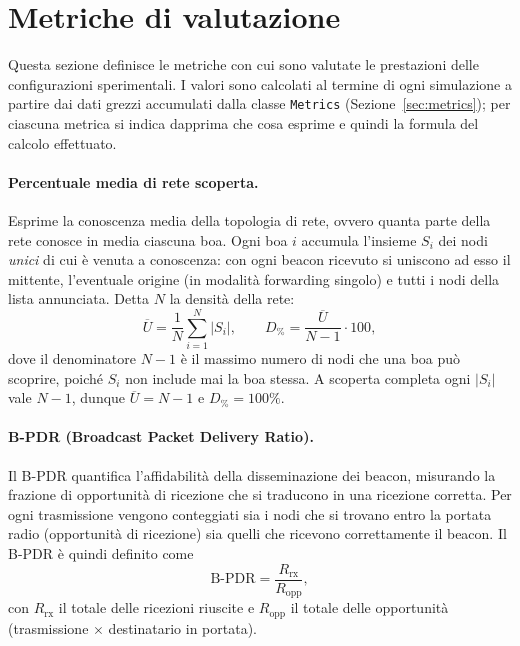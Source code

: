 \section{Metriche di valutazione}
\label{sec:eval-metrics}
Questa sezione definisce le metriche con cui sono valutate le prestazioni
delle configurazioni sperimentali. I valori sono calcolati al termine di ogni
simulazione a partire dai dati grezzi accumulati dalla classe \texttt{Metrics}
(Sezione~\ref{sec:metrics}); per ciascuna metrica si indica dapprima che cosa
esprime e quindi la formula del calcolo effettuato.

\paragraph{Percentuale media di rete scoperta.} Esprime la conoscenza media
della topologia di rete, ovvero quanta parte della rete conosce in media ciascuna boa.
Ogni boa $i$ accumula l'insieme
$S_i$ dei nodi \emph{unici} di cui \`e venuta a conoscenza:  con ogni beacon
ricevuto si uniscono ad esso il mittente, l'eventuale origine (in modalit\`a
forwarding singolo) e tutti i nodi della lista annunciata. Detta $N$ la densit\`a della rete:
\begin{equation}
  \overline{U} = \frac{1}{N} \sum_{i=1}^{N} |S_i|,
  \qquad
  D_{\%} = \frac{\overline{U}}{N-1} \cdot 100,
  \label{eq:netdisc}
\end{equation}
dove il denominatore $N-1$ \`e il massimo numero di nodi che una boa pu\`o
scoprire, poich\'e $S_i$ non include mai la boa stessa. A scoperta completa
ogni $|S_i|$ vale $N-1$, dunque $\overline{U}=N-1$ e $D_{\%}=100\%$.

\paragraph{B-PDR (Broadcast Packet Delivery Ratio).} Il B-PDR quantifica
l'affidabilit\`a della disseminazione dei beacon, misurando la frazione di
opportunit\`a di ricezione che si traducono in una ricezione corretta. Per ogni
trasmissione vengono conteggiati sia i nodi che si trovano entro la portata
radio (opportunit\`a di ricezione) sia quelli che ricevono correttamente il
beacon. Il B-PDR \`e quindi definito come
\begin{equation}
  \text{B-PDR} = \frac{R_{\text{rx}}}{R_{\text{opp}}},
  \label{eq:bpdr}
\end{equation}
con $R_{\text{rx}}$ il totale delle ricezioni riuscite e $R_{\text{opp}}$ il
totale delle opportunit\`a (trasmissione $\times$ destinatario in portata).

